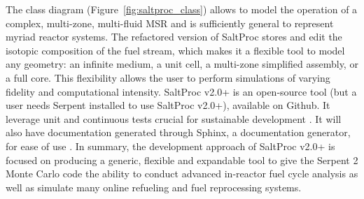 The class diagram (Figure~\ref{fig:saltproc_class}) allows to model 
the operation of a complex, multi-zone, 
multi-fluid \gls{MSR} and is sufficiently general to represent myriad reactor 
systems. The refactored version of SaltProc stores and edit the 
isotopic composition of the fuel stream, which makes it a flexible tool to 
model any geometry: an infinite medium, a unit cell, a multi-zone simplified 
assembly, or a full core. This flexibility allows the user to perform 
simulations of varying fidelity and computational intensity. SaltProc v2.0+ is 
an 
open-source tool (but a user needs Serpent installed to use SaltProc v2.0+), 
available on Github. It leverage unit and continuous tests  
crucial for sustainable development \cite{krekel_pytest_2004}. It will also 
have documentation generated through Sphinx, a documentation generator, for 
ease 
of use \cite{brandl_sphinx_2009}. In summary, the 
development approach of SaltProc v2.0+ is focused on producing a generic, 
flexible and 
expandable tool to give the Serpent 2 Monte Carlo code the ability to conduct 
advanced in-reactor fuel cycle analysis as well as simulate many 
online refueling and fuel reprocessing systems.



